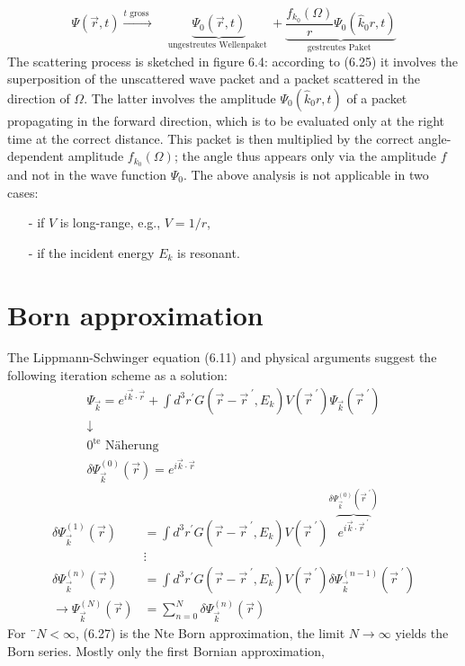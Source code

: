 \begin{equation}
    \Psi(\vec{r}, t) \stackrel{t \text { gross }}{\longrightarrow} \quad \underbrace{\Psi_{0}(\vec{r}, t)}_{\text {ungestreutes Wellenpaket }}+\underbrace{\frac{f_{k_{0}}(\Omega)}{r} \Psi_{0}\left(\hat{k}_{0} r, t\right)}_{\text {gestreutes Paket }}
    \end{equation}
The scattering process is sketched in figure 6.4: according to (6.25) it involves the superposition of the unscattered wave packet and a packet scattered in the direction of $\Omega$. The latter involves the amplitude $\Psi_0(\hat{k}_0r,t)$ of a packet propagating in the forward direction, which is to be evaluated only at the right time at the correct distance. This packet is then multiplied by the correct angle-dependent amplitude $f_{k_0}(\Omega)$; the angle thus appears only via the amplitude $f$ and not in the wave function $\Psi_0$. The above analysis is not applicable in two cases:
\begin{enumerate}
    \item[-] if $V$ is long-range, e.g., $V = 1 / r$,
    \item[-] if the incident energy $E_k$ is resonant.
\end{enumerate}


\section{Born approximation}
The Lippmann-Schwinger equation (6.11) and physical arguments suggest the following iteration scheme as a solution:
\begin{equation}
\begin{array}{c}{\Psi_{\vec{k}}=e^{i \vec{k} \cdot \vec{r}}+\int d^{3} r^{\prime} G\left(\vec{r}-\vec{r}^{\;\prime}, E_{k}\right) V\left(\vec{r}^{\;\prime}\right)  \Psi_{\vec{k}}\left(\vec{r}^{\;\prime}\right)} \\ {\downarrow} \\ {0^{\mathrm{te}} \text { Näherung }} \\ {\delta \Psi_{\vec{k}}^{(0)}(\vec{r})=e^{i \vec{k} \cdot \vec{r}}}\end{array}
\end{equation}
\begin{equation}
\begin{aligned} \delta \Psi_{\vec{k}}^{(1)}(\vec{r}) &=\int d^{3} r^{\prime} G\left(\vec{r}-\vec{r}^{\;\prime}, E_{k}\right) V\left(\vec{r}^{\;\prime}\right) \overbrace{e^{i\vec{k}\cdot\vec{r}^{\;\prime}}}^{\delta\Psi_{\vec{k}}^{(0)}(\vec{r}^{\;\prime})} \\ & \vdots \\ \delta \Psi_{\vec{k}}^{(n)}(\vec{r}) &=\int d^{3} r^{\prime} G\left(\vec{r}-\vec{r}^{\;\prime}, E_{k}\right) V\left(\vec{r}^{\;\prime}\right) \delta \Psi^{(n-1)}_{\vec{k}}\left(\vec{r}^{\;\prime}\right) \\ \rightarrow \Psi_{\vec{k}}^{(N)}(\vec{r}) &=\sum_{n=0}^{N} \delta \Psi_{\vec{k}}^{(n)}(\vec{r}) \end{aligned}
\end{equation}
For ¨$N <\infty$, (6.27) is the Nte Born approximation, the limit $N \rightarrow\infty$ yields the Born series. Mostly only the first Bornian approximation,

